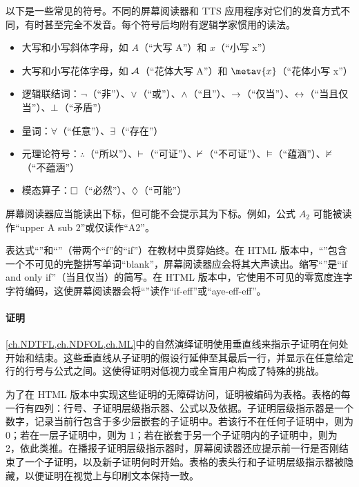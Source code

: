 以下是一些常见的符号。不同的屏幕阅读器和 TTS 应用程序对它们的发音方式不同，有时甚至完全不发音。每个符号后均附有逻辑学家惯用的读法。
\begin{itemize}
  \item 大写和小写斜体字母，如 $A$（“大写 A”）和 $x$（“小写 x”）
  \item 大写和小写花体字母，如 $\mathcal{A}$（“花体大写 A”）和 $\metav{x}$（“花体小写 x”）
  \item 逻辑联结词：$\neg$（“非”）、$\vee$（“或”）、$\wedge$（“且”）、$\rightarrow$（“仅当”）、$\leftrightarrow$（“当且仅当”）、$\bot$（“矛盾”）
  \item 量词：$\forall$（“任意”）、$\exists$（“存在”）
  \item 元理论符号：$\therefore$（“所以”）、$\vdash$（“可证”）、$\nvdash$（“不可证”）、$\vDash$（“蕴涵”）、$\nvDash$（“不蕴涵”）
  \item 模态算子：$\Box$（“必然”）、$\Diamond$（“可能”）
\end{itemize}

屏幕阅读器应当能读出下标，但可能不会提示其为下标。例如，公式 $A_2$ 可能被读作“upper A sub 2”或仅读作“A2”。

表达式“\blank{}”和“\ifeff”（带两个“f”的“if”）在教材中贯穿始终。在 HTML 版本中，“\blank{}”包含一个不可见的完整拼写单词“blank”，屏幕阅读器应会将其大声读出。缩写“\ifeff”是“if and only if”（当且仅当）的简写。在 HTML 版本中，它使用不可见的零宽度连字字符编码，这使屏幕阅读器会将“\ifeff”读作“if-eff”或“aye-eff-eff”。

\paragraph{证明}\cref{ch.NDTFL,ch.NDFOL,ch.ML}中的自然演绎证明使用垂直线来指示子证明在何处开始和结束。这些垂直线从子证明的假设行延伸至其最后一行，并显示在任意给定行的行号与公式之间。这使得证明对低视力或全盲用户构成了特殊的挑战。

为了在 HTML 版本中实现这些证明的无障碍访问，证明被编码为表格。表格的每一行有四列：行号、子证明层级指示器、公式以及依据。子证明层级指示器是一个数字，记录当前行包含于多少层嵌套的子证明中。若该行不在任何子证明中，则为 0；若在一层子证明中，则为 1；若在嵌套于另一个子证明内的子证明中，则为 2，依此类推。在播报子证明层级指示器时，屏幕阅读器还应提示前一行是否刚结束了一个子证明，以及新子证明何时开始。表格的表头行和子证明层级指示器被隐藏，以便证明在视觉上与印刷文本保持一致。

